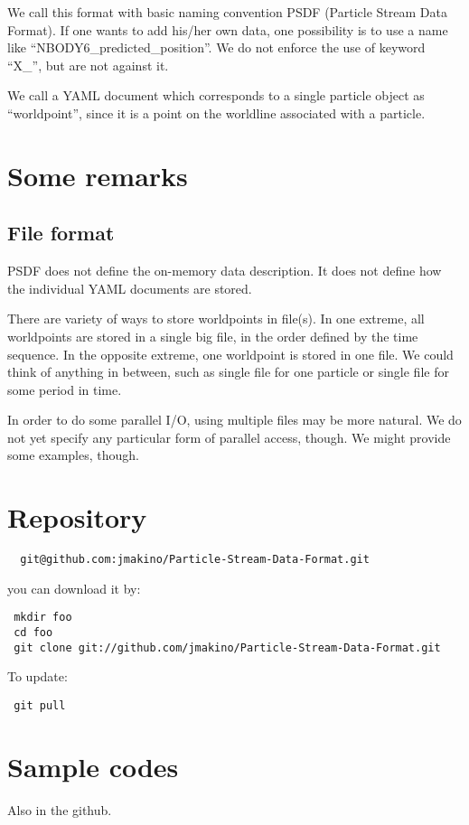 \documentclass[12pt]{article}
\begin{document}
We call this format with basic naming convention PSDF (Particle Stream
Data Format). If one wants to add his/her own data, one possibility is
to use a name like ``NBODY6\_predicted\_position''. We do not enforce
the use of keyword  ``X\_'', but are not against it.

We call a YAML document which corresponds to a single particle object
as ``worldpoint'', since it is a point on the worldline associated
with a particle. 


\section{Some remarks}

\subsection{File format}
PSDF does not define the on-memory data description. It does not
define how the individual YAML documents are stored.

There are variety of ways to store worldpoints in file(s). In one
extreme, all worldpoints are stored in a single big file, in the order
defined by the time sequence. In the opposite extreme, one worldpoint is
stored in one file. We could think of anything in between, such as
single file for one particle or single file for some period in time.

In order to do some parallel I/O, using multiple files may be more
natural. We do not yet specify any particular form of parallel access,
though. We might provide some examples, though.


\section{Repository}


\begin{verbatim}
  git@github.com:jmakino/Particle-Stream-Data-Format.git
\end{verbatim}

you can download it by:
\begin{verbatim}
 mkdir foo
 cd foo
 git clone git://github.com/jmakino/Particle-Stream-Data-Format.git
\end{verbatim}

To update:

\begin{verbatim}
 git pull
\end{verbatim}

\section{Sample codes}
Also in the github.
\end{document}
